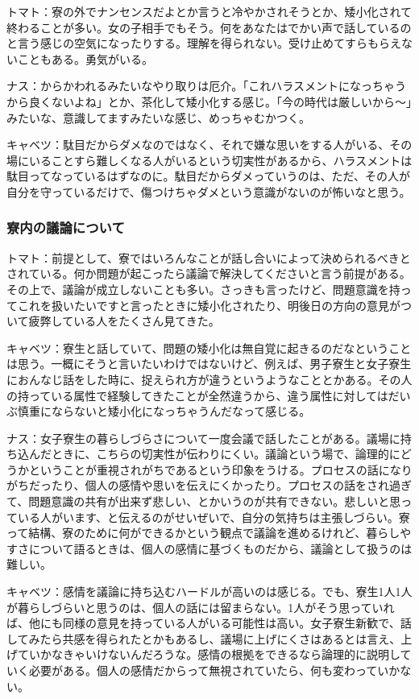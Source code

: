 トマト：寮の外でナンセンスだよとか言うと冷やかされそうとか、矮小化されて終わることが多い。女の子相手でもそう。何をあなたはでかい声で話しているのと言う感じの空気になったりする。理解を得られない。受け止めてすらもらえないこともある。勇気がいる。

ナス：からかわれるみたいなやり取りは厄介。「これハラスメントになっちゃうから良くないよね」とか、茶化して矮小化する感じ。「今の時代は厳しいから～」みたいな、意識してますみたいな感じ、めっちゃむかつく。

キャベツ：駄目だからダメなのではなく、それで嫌な思いをする人がいる、その場にいることすら難しくなる人がいるという切実性があるから、ハラスメントは駄目ってなっているはずなのに。駄目だからダメっていうのは、ただ、その人が自分を守っているだけで、傷つけちゃダメという意識がないのが怖いなと思う。

\subsubsection{寮内の議論について}
トマト：前提として、寮ではいろんなことが話し合いによって決められるべきとされている。何か問題が起こったら議論で解決してくださいと言う前提がある。その上で、議論が成立しないことも多い。さっきも言ったけど、問題意識を持ってこれを扱いたいですと言ったときに矮小化されたり、明後日の方向の意見がついて疲弊している人をたくさん見てきた。

キャベツ：寮生と話していて、問題の矮小化は無自覚に起きるのだなということは思う。一概にそうと言いたいわけではないけど、例えば、男子寮生と女子寮生におんなじ話をした時に、捉えられ方が違うというようなこととかある。その人の持っている属性で経験してきたことが全然違うから、違う属性に対してはだいぶ慎重にならないと矮小化になっちゃうんだなって感じる。

ナス：女子寮生の暮らしづらさについて一度会議で話したことがある。議場に持ち込んだときに、こちらの切実性が伝わりにくい。議論という場で、論理的にどうかということが重視されがちであるという印象をうける。プロセスの話になりがちだったり、個人の感情や思いを伝えにくかったり。プロセスの話をされ過ぎて、問題意識の共有が出来ず悲しい、とかいうのが共有できない。悲しいと思っている人がいます、と伝えるのがせいぜいで、自分の気持ちは主張しづらい。寮って結構、寮のために何ができるかという観点で議論を進めるけれど、暮らしやすさについて語るときは、個人の感情に基づくものだから、議論として扱うのは難しい。

キャベツ：感情を議論に持ち込むハードルが高いのは感じる。でも、寮生1人1人が暮らしづらいと思うのは、個人の話には留まらない。1人がそう思っていれば、他にも同様の意見を持っている人がいる可能性は高い。女子寮生新歓で、話してみたら共感を得られたとかもあるし、議場に上げにくさはあるとは言え、上げていかなきゃいけないんだろうな。感情の根拠をできるなら論理的に説明していく必要がある。個人の感情だからって無視されていたら、何も変わっていかない。

